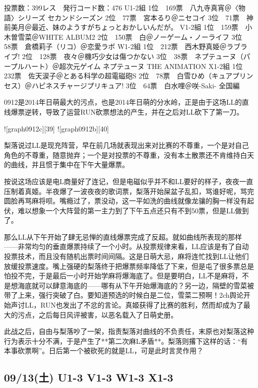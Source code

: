 	投票数：399レス　発行コード数：476
	U1-2組
	1位　169票　八九寺真宵＠〈物語〉シリーズ セカンドシーズン
	2位　77票　宮本るり＠ニセコイ
	3位　71票　神前美月＠最近、妹のようすがちょっとおかしいんだが。
	V1-2組
	1位　159票　小木曽雪菜＠WHITE ALBUM2
	2位　150票　白＠ノーゲーム・ノーライフ
	3位　58票　倉橋莉子（リコ）＠恋愛ラボ
	W1-2組
	1位　212票　西木野真姫＠ラブライブ!
	2位　128票　夜々＠機巧少女は傷つかない
	3位　38票　ネプテューヌ（パープルハート）＠超次元ゲイム ネプテューヌ THE ANIMATION
	X1-2組
	1位　232票　佐天涙子＠とある科学の超電磁砲S
	2位　78票　白雪ひめ（キュアプリンセス）＠ハピネスチャージプリキュア!
	3位　64票　白水哩＠咲-Saki- 全国編

0912是2014年日萌最大的污点，也是2014年日萌的分水岭，正是由于这场LL的直线爆票逆转，导致了运营RUN砍票想法的产生，并在之后对LL砍下了第一刀。

![graph0912c][39]
![graph0912b][40]

梨落说过LL是现充阵营，早在前几场就表现出来对比赛的不尊重，一个是对自己角色的不尊重，随意抛弃；一个是对投票的不尊重，没有本土散票还不肯维持白天的曲线，并且惯于集中在下午大量爆票。

按说这场应该是电L商量好了连记，但是电磁似乎并不和LL要好的样子，夜夜一直压制着真姬。半夜爆了一波夜夜的歌词票，梨落开始屎盆子乱扣，骂谁好呢，骂完圆脸再骂麻将呗。嘴瘾过了，票没动，这一平如洗的曲线就像龙骧的胸一样没有起伏，难以想象一个大阵营的第一主力到了下午五点还只有不到50票，但是LL做到了。

那么LL从下午开始了肆无忌惮的直线爆票完成了反超。就如曲线所表现的那样——非常均匀的垂直爆票持续了一个小时。从投票规律来看，LL应该是有了自动投票技术，而且没有随机出票时间间隔。这是日萌大忌，麻将连忙找到LL让他们放缓投票速度。嘴上强硬的梨落终于把爆票频率降低了下来，但是屯了很多票总是怕投不完，于是最后一小时开始学麻将爆海底了。但是要明白，LL不是麻将，不是想海底就可以肆意海底的——哪有从下午开始爆海底的？另一边，隔壁的雪菜被带了上来，强行突破了白。要知道预选的时候白是二位，雪菜二预啊！2ch舆论开始声讨LL，RUN也发出了不忿的言论。真姬获得了比赛的胜利，然而却成为了最大的污点，之后每日风评被害，以恶名载入了日萌史册。

此战之后，自由与梨落吵了一架，指责梨落对曲线的不负责任，末原也对梨落这种行为表示十分不满，于是产生了**第二次麻L矛盾**。梨落则撂下这样的话：“有本事砍票啊”。日后第一个被砍死的就是LL，可是此时言灵作用？

\subsection{09/13(土) U1-3 V1-3 W1-3 X1-3}

